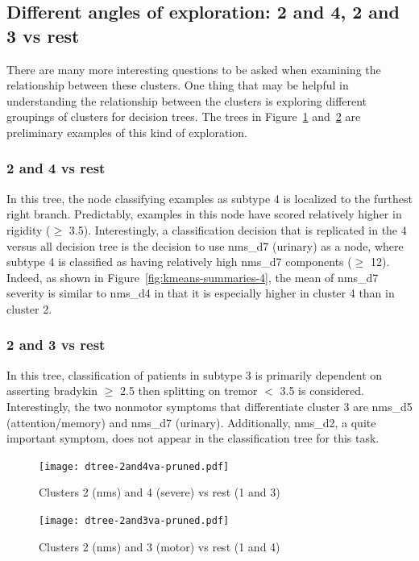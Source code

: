 \documentclass[10pt]{article}
\begin{document}
\begin{multicols}{2}
\subsection{Different angles of exploration: 2 and 4, 2 and 3 vs rest}

There are many more interesting questions to be asked when examining the
relationship between these clusters. One thing that may be helpful in
understanding the relationship between the clusters is exploring different
groupings of clusters for decision trees. The trees in
Figure~\ref{fig:dtree-2and4va-pruned} and~\ref{fig:dtree-2and3va-pruned} are
preliminary examples of this kind
of exploration.

\subsubsection{2 and 4 vs rest}
In this tree, the node classifying examples as subtype 4 is
localized to the furthest right branch. Predictably, examples in this node have
scored relatively higher in rigidity ($\geq$ 3.5). Interestingly, a classification
decision that is replicated in the 4 versus all decision tree is the decision
to use nms\_d7 (urinary) as a node, where subtype 4 is classified as having
relatively high nms\_d7 components ($\geq$ 12). Indeed, as shown in
Figure~\ref{fig:kmeans-summaries-4}, the mean of nms\_d7 severity is similar to
nms\_d4 in that it is especially higher in cluster 4 than in cluster 2.

\subsubsection{2 and 3 vs rest}
In this tree, classification of patients in subtype 3 is primarily dependent on
asserting bradykin $\geq$ 2.5 then splitting on tremor $<$ 3.5 is considered.
Interestingly, the two nonmotor symptoms that differentiate cluster 3 are
nms\_d5 (attention/memory) and nms\_d7 (urinary). Additionally, nms\_d2, a
quite important symptom, does not appear in the classification tree for this
task.

\begin{figure}[H]
  \centering
  \texttt{[image: dtree-2and4va-pruned.pdf]}
  \caption{Clusters 2 (nms) and 4 (severe) vs rest (1 and 3)}
  \label{fig:dtree-2and4va-pruned}
\end{figure}

\begin{figure}[H]
  \centering
  \texttt{[image: dtree-2and3va-pruned.pdf]}
  \caption{Clusters 2 (nms) and 3 (motor) vs rest (1 and 4)}
  \label{fig:dtree-2and3va-pruned}
\end{figure}


\end{multicols}
\end{document}
